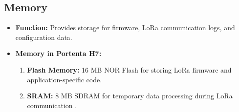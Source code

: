 \subsection{Memory}
\begin{itemize}
	\item \textbf{Function:} Provides storage for firmware, LoRa communication logs, and configuration data.
	\item \textbf{Memory in Portenta H7:} 
	\begin{enumerate}
		\item \textbf{Flash Memory:} 16 MB NOR Flash for storing LoRa firmware and application-specific code.
		\item \textbf{SRAM:} 8 MB SDRAM for temporary data processing during LoRa communication \cite{arduino_portenta:2025}.
	\end{enumerate}
\end{itemize}


